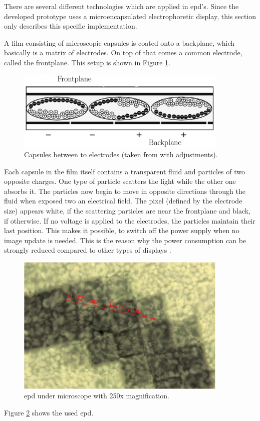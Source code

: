 There are several different technologies which are applied in \acl{epd}'s.
Since the developed prototype uses a microencapsulated electrophoretic display, this section only describes this specific implementation.

A film consisting of microscopic capsules is coated onto a backplane, which basically is a matrix of electrodes.
On top of that comes a common electrode, called the frontplane.
This setup is shown in Figure \ref{theory:capsules}.

\begin{figure}[ht]
	\centering
	\includegraphics[width=0.9\textwidth]{2-theory/e-paper-display/graphics/capsules.pdf}
	\caption{Capsules between to electrodes (taken from \cite{amundson} with adjustments).\label{theory:capsules}}
\end{figure}

Each capsule in the film itself contains a transparent fluid and particles of two opposite charges.
One type of particle scatters the light while the other one absorbs it.
The particles now begin to move in opposite directions through the fluid when exposed two an electrical field. 
The pixel (defined by the electrode size) appears white, if the scattering particles are near the frontplane and black, if otherwise.
If no voltage is applied to the electrodes, the particles maintain their last position.
This makes it possible, to switch off the power supply when no image update is needed. 
This is the reason why the power consumption can be strongly reduced compared to other types of displays \cite{amundson}.

\begin{figure}[ht]
	\centering
	\includegraphics[width=0.9\textwidth]{2-theory/e-paper-display/graphics/epaper_mikroskop.pdf}
	\caption{\acl{epd} under microscope with 250x magnification.\label{theory:micro}}
\end{figure}

Figure \ref{theory:micro} shows the used \acl{epd}.